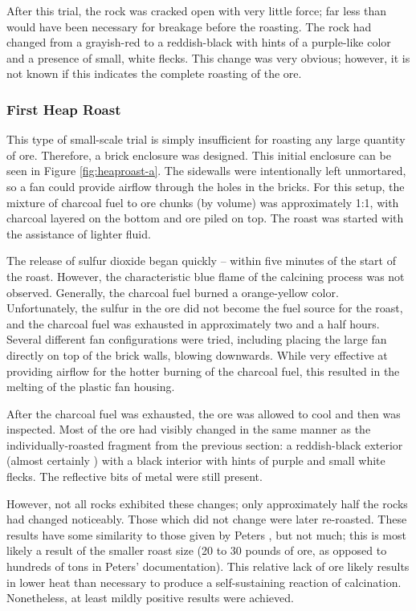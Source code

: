 After this trial, the rock was cracked open with very little force; far less
than would have been necessary for breakage before the roasting.  The rock had
changed from a grayish-red to a reddish-black with hints of a purple-like color
and a presence of small, white flecks.  This change was very obvious; however,
it is not known if this indicates the complete roasting of the ore.

\subsubsection{First Heap Roast}

This type of small-scale trial is simply insufficient for roasting any large
quantity of ore.  Therefore, a brick enclosure was designed.  This initial
enclosure can be seen in Figure \ref{fig:heaproast-a}.  The sidewalls were
intentionally left unmortared, so a fan could provide airflow through the holes
in the bricks.  For this setup, the mixture of charcoal fuel to ore chunks (by
volume) was approximately 1:1, with charcoal layered on the bottom and ore piled
on top.  The roast was started with the assistance of lighter fluid.

The release of sulfur dioxide began quickly -- within five minutes of the start
of the roast.  However, the characteristic blue flame of the calcining process
was not observed.  Generally, the charcoal fuel burned a orange-yellow color.
Unfortunately, the sulfur in the ore did not become the fuel source for the
roast, and the charcoal fuel was exhausted in approximately two and a half
hours.  Several different fan configurations were tried, including placing the
large fan directly on top of the brick walls, blowing downwards.  While very
effective at providing airflow for the hotter burning of the charcoal fuel, this
resulted in the melting of the plastic fan housing.

After the charcoal fuel was exhausted, the ore was allowed to cool and then was
inspected.  Most of the ore had visibly changed in the same manner as the
individually-roasted fragment from the previous section: a reddish-black
exterior (almost certainly ) with a black interior with hints of purple
and small white flecks.  The reflective bits of metal were still present.

However, not all rocks exhibited these changes; only approximately half the
rocks had changed noticeably.  Those which did not change were later re-roasted.
These results have some similarity to those given by Peters \cite{peters1887},
but not much; this is most likely a result of the smaller roast size (20 to 30
pounds of ore, as opposed to hundreds of tons in Peters' documentation).  This
relative lack of ore likely results in lower heat than necessary to produce a
self-sustaining reaction of calcination.  Nonetheless, at least mildly positive
results were achieved.

